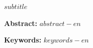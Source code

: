 \begin{center}
{\fontsize{16pt}{46.8pt}\selectfont\bfseries $subtitle$\par}
\end{center}
\vspace{52.34pt}
{\xiaosi\noindent\hspace*{2em}\textbf{Abstract:} $abstract-en$\par}

{\xiaosi\noindent\hspace*{2em}\textbf{Keywords:} $keywords-en$\par}
\newpage

\renewcommand{\contentsname}{正文目录}
\vspace*{-5.6pt}
\tableofcontents
\newpage

\setcounter{page}{1}
\vspace*{-15.3pt}
